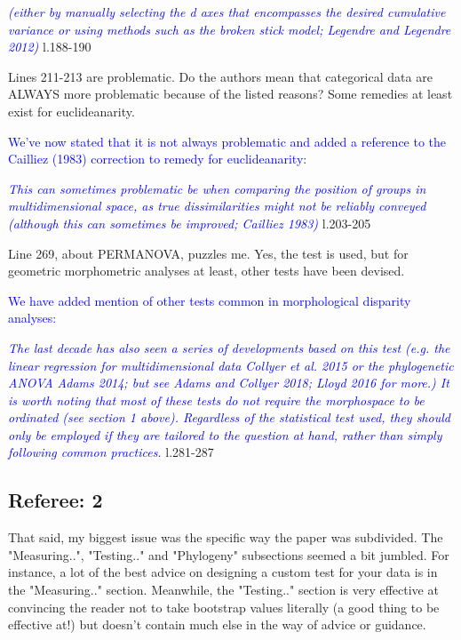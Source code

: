 \documentclass[12pt,letterpaper]{article}
\begin{document}
\textcolor{blue}{\textit{(either by manually selecting the d axes that encompasses the desired cumulative variance or using methods such as the broken stick model; Legendre and Legendre 2012)}} l.188-190 %

\noindent Lines 211-213 are problematic. Do the authors mean that categorical data are ALWAYS more problematic because of the listed reasons? Some remedies at least exist for euclideanarity.

\textcolor{blue}{We've now stated that it is not always problematic and added a reference to the Cailliez (1983) correction to remedy for euclideanarity}:

\textcolor{blue}{\textit{
This can sometimes problematic be when comparing the position of groups in multidimensional space, as true dissimilarities might not be reliably conveyed (although this can sometimes be improved; Cailliez 1983)}} l.203-205 %

\noindent Line 269, about PERMANOVA, puzzles me. Yes, the test is used, but for geometric morphometric analyses at least, other tests have been devised.

\textcolor{blue}{We have added mention of other tests common in morphological disparity analyses:}

\textcolor{blue}{\textit{The last decade has also seen a series of developments based on this test (e.g. the linear regression for multidimensional data  Collyer et al. 2015 or the phylogenetic ANOVA Adams 2014; but see Adams and Collyer 2018; Lloyd 2016 for more.)
It is worth noting that most of these tests do not require the morphospace to be ordinated (see section 1 above).
Regardless of the statistical test used, they should only be employed if they are tailored to the question at hand, rather than simply following common practices.}} l.281-287 %

\subsection{Referee: 2}

\noindent That said, my biggest issue was the specific way the paper was subdivided. The "Measuring..", "Testing.." and "Phylogeny" subsections seemed a bit jumbled. For instance, a lot of the best advice on designing a custom test for your data is in the "Measuring.." section. Meanwhile, the "Testing.." section is very effective at convincing the reader not to take bootstrap values literally (a good thing to be effective at!) but doesn't contain much else in the way of advice or guidance.
\end{document}
